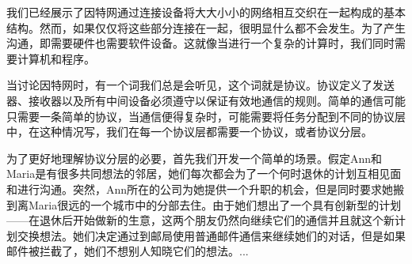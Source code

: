我们已经展示了因特网通过连接设备将大大小小的网络相互交织在一起构成的基本结构。然而，如果仅仅将这些部分连接在一起，很明显什么都不会发生。为了产生沟通，即需要硬件也需要软件设备。这就像当进行一个复杂的计算时，我们同时需要计算机和程序。

当讨论因特网时，有一个词我们总是会听见，这个词就是协议。协议定义了发送器、接收器以及所有中间设备必须遵守以保证有效地通信的规则。简单的通信可能只需要一条简单的协议，当通信便得复杂时，可能需要将任务分配到不同的协议层中，在这种情况写，我们在每一个协议层都需要一个协议，或者协议分层。

为了更好地理解协议分层的必要，首先我们开发一个简单的场景。假定Ann和Maria是有很多共同想法的邻居，她们每次都会为了一个何时退休的计划互相见面和进行沟通。突然，Ann所在的公司为她提供一个升职的机会，但是同时要求她搬到离Maria很远的一个城市中的分部去住。由于她们想出了一个具有创新型的计划——在退休后开始做新的生意，这两个朋友仍然向继续它们的通信并且就这个新计划交换想法。她们决定通过到邮局使用普通邮件通信来继续她们的对话，但是如果邮件被拦截了，她们不想别人知晓它们的想法。...
